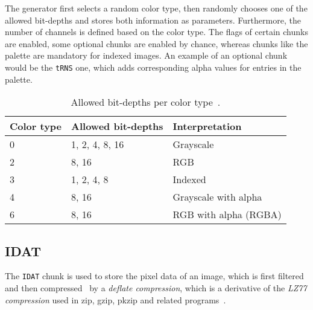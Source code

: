 \documentclass[runningheads]{llncs}
\begin{document}
The generator first selects a random color type, then randomly chooses one of the allowed bit-depths and stores both information as parameters.
Furthermore, the number of channels is defined based on the color type. The flags of certain chunks are enabled, some optional chunks are enabled by chance, whereas chunks like the palette are mandatory for indexed images.
An example of an optional chunk would be the \texttt{tRNS} one, which adds corresponding alpha values for entries in the palette.
\bgroup
\def\arraystretch{1.5}
\setlength\tabcolsep{1.5ex}
    \begin{table}[]
        \caption{Allowed bit-depths per color type~\cite{libpng_chunks}.}
        \label{tab2}
        \begin{center}
            \begin{tabular}{|l|l|l|}
            \hline
            \textbf{Color type} & \textbf{Allowed bit-depths} & \textbf{Interpretation} \\ \hline \hline 
            0                   & 1, 2, 4, 8, 16              & Grayscale               \\ \hline
            2                   & 8, 16                       & RGB                     \\ \hline
            3                   & 1, 2, 4, 8                  & Indexed                 \\ \hline
            4                   & 8, 16                       & Grayscale with alpha    \\ \hline
            6                   & 8, 16                       & RGB with alpha (RGBA)   \\ \hline
            \end{tabular}
        \end{center}
    \end{table}
\egroup
\subsection{IDAT}
The \texttt{IDAT} chunk is used to store the pixel data of an image, which is first filtered and then compressed~\cite{libpng_chunks} by a \textit{deflate compression}, which is a derivative of the \textit{LZ77 compression} used in zip, gzip, pkzip and related programs~\cite{libpng_deflate}.
\end{document}
